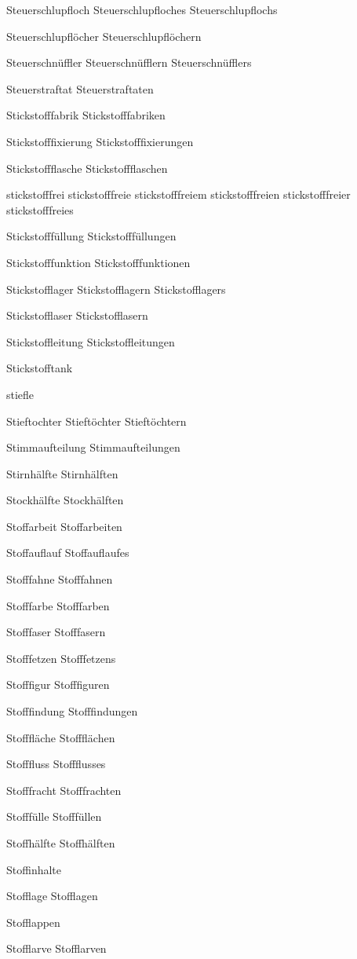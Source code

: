 Steuerschlupfloch
Steuerschlupfloches
Steuerschlupflochs

Steuerschlupflöcher
Steuerschlupflöchern

Steuerschnüffler
Steuerschnüfflern
Steuerschnüfflers

Steuerstraftat
Steuerstraftaten

Stickstofffabrik
Stickstofffabriken

Stickstofffixierung
Stickstofffixierungen

Stickstoffflasche
Stickstoffflaschen

stickstofffrei
stickstofffreie
stickstofffreiem
stickstofffreien
stickstofffreier
stickstofffreies

Stickstofffüllung
Stickstofffüllungen

Stickstofffunktion
Stickstofffunktionen

Stickstofflager
Stickstofflagern
Stickstofflagers

Stickstofflaser
Stickstofflasern

Stickstoffleitung
Stickstoffleitungen

Stickstofftank

stiefle

Stieftochter
Stieftöchter
Stieftöchtern

Stimmaufteilung
Stimmaufteilungen

Stirnhälfte
Stirnhälften

Stockhälfte
Stockhälften

Stoffarbeit
Stoffarbeiten

Stoffauflauf
Stoffauflaufes

Stofffahne
Stofffahnen

Stofffarbe
Stofffarben

Stofffaser
Stofffasern

Stofffetzen
Stofffetzens

Stofffigur
Stofffiguren

Stofffindung
Stofffindungen

Stofffläche
Stoffflächen

Stofffluss
Stoffflusses

Stofffracht
Stofffrachten

Stofffülle
Stofffüllen

Stoffhälfte
Stoffhälften

Stoffinhalte

Stofflage
Stofflagen

Stofflappen

Stofflarve
Stofflarven

